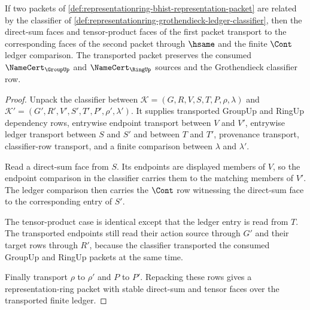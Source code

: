 \begin{theorem}
\label{thm:representationring-direct-sum-tensor-ledger-stability}
If two packets of
\autoref{def:representationring-bhist-representation-packet} are related by
the classifier of
\autoref{def:representationring-grothendieck-ledger-classifier}, then the
direct-sum faces and tensor-product faces of the first packet transport to
the corresponding faces of the second packet through $\hsame$ and the finite
$\Cont$ ledger comparison. The transported packet preserves the consumed
$\NameCert_{\GroupUp}$ and $\NameCert_{\RingUp}$ sources and the
Grothendieck classifier row.
\end{theorem}
\begin{proof}
Unpack the classifier between
$\mathcal{K}=(G,R,V,S,T,P,\rho,\lambda)$ and
$\mathcal{K}'=(G',R',V',S',T',P',\rho',\lambda')$. It supplies transported
GroupUp and RingUp dependency rows, entrywise endpoint transport between
$V$ and $V'$, entrywise ledger transport between $S$ and $S'$ and between
$T$ and $T'$, provenance transport, classifier-row transport, and a finite
comparison between $\lambda$ and $\lambda'$.

Read a direct-sum face from $S$. Its endpoints are displayed members of
$V$, so the endpoint comparison in the classifier carries them to the
matching members of $V'$. The ledger comparison then carries the $\Cont$
row witnessing the direct-sum face to the corresponding entry of $S'$.

The tensor-product case is identical except that the ledger entry is read
from $T$. The transported endpoints still read their action source through
$G'$ and their target rows through $R'$, because the classifier transported
the consumed GroupUp and RingUp packets at the same time.

Finally transport $\rho$ to $\rho'$ and $P$ to $P'$. Repacking these rows
gives a representation-ring packet with stable direct-sum and tensor faces
over the transported finite ledger.
\end{proof}

